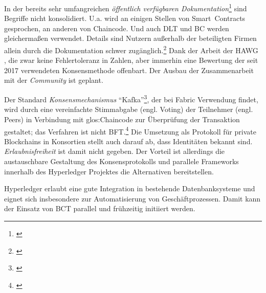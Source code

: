In der bereits sehr umfangreichen \emph{öffentlich verfügbaren Dokumentation}\footnote{\cite{w:hyperledger:doc}} sind Begriffe nicht konsolidiert.
U.a. wird an einigen Stellen von Smart~Contracts gesprochen, an anderen von Chaincode.
Und auch \gls{DLT} und \gls{BC} werden gleichermaßen verwendet.
Details sind Nutzern außerhalb der beteiligten Firmen allein durch die Dokumentation schwer zugänglich.\footnote{\cite{p:hyperledger:arch}}
Dank der Arbeit der \gls{HAWG} \cite{p:hyperledger:consensus}, die zwar keine Fehlertoleranz in Zahlen, aber immerhin eine Bewertung der seit 2017 verwendeten Konsensmethode offenbart.
Der Ausbau der Zusammenarbeit mit der \emph{Community} ist geplant.

Der Standard \emph{Konsensmechanismus} \enquote{Kafka}\footnote{\cite{w:kafka}}, der bei  Fabric Verwendung findet, wird durch eine vereinfachte Stimmabgabe (engl. Voting) der Teilnehmer (engl. Peers) in Verbindung mit \gls{glos:Chaincode} zur Überprüfung der Transaktion gestaltet; das Verfahren ist nicht \gls{BFT}.\footnote{\cite{w:hyperledger:txworkflow}}
Die Umsetzung als Protokoll für private Blockchains in Konsortien stellt auch darauf ab, dass Identitäten bekannt sind.
\emph{Erlaubnisfreiheit} ist damit nicht gegeben.
Der Vorteil ist allerdings die austauschbare Gestaltung des Konsensprotokolls und parallele Frameworks innerhalb des Hyperledger Projektes die Alternativen bereitstellen.

Hyperledger erlaubt eine gute Integration in bestehende Datenbanksysteme und eignet sich insbesondere zur Automatisierung von Geschäftprozessen.
Damit kann der Einsatz von \gls{BCT} parallel und frühzeitig initiiert werden.

